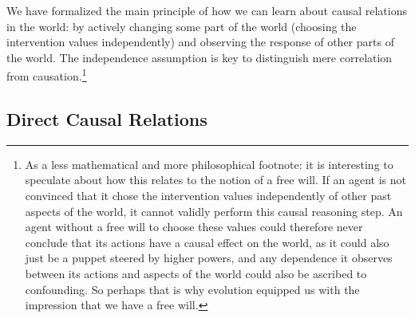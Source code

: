 
We have formalized the main principle of how we can learn about causal relations in the world: by actively changing some part of the world (choosing the intervention values independently) and observing the response of other parts of the world.
The independence assumption is key to distinguish mere correlation from causation.\footnote{As a less mathematical and more philosophical footnote: it is interesting to speculate about how this relates to the notion of a free will. 
If an agent is not convinced that it chose the intervention values independently of other past aspects of the world, it cannot validly perform this causal reasoning step. 
An agent without a free will to choose these values could therefore never conclude that its actions have a causal effect on the world, as it could also just be a puppet steered by higher powers, and any dependence it observes between its actions and aspects of the world could also be ascribed to confounding. 
So perhaps that is why evolution equipped us with the impression that we have a free will.}

\subsection{Direct Causal Relations}

